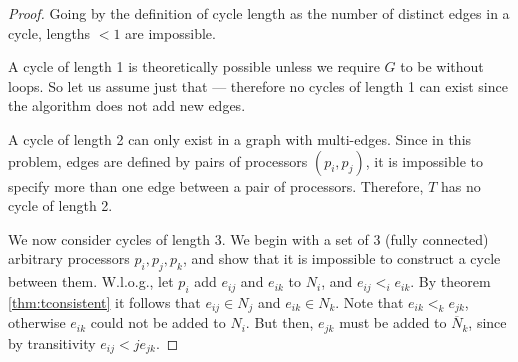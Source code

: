 \begin{proof}
Going by the definition of cycle length as the number of distinct edges in a
cycle, lengths $< 1$ are impossible.

A cycle of length 1 is theoretically possible unless we require $G$ to be
without loops. So let us assume just that --- therefore no cycles of length
1 can exist since the algorithm does not add new edges.

A cycle of length 2 can only exist in a graph with multi-edges. 
Since in this problem, edges are defined by pairs of processors $(p_i, p_j)$,
it is impossible to specify more than one edge between a pair of processors.
Therefore, $T$ has no cycle of length 2.

We now consider cycles of length 3. We begin with a set of 3 (fully connected)
arbitrary processors
$p_i, p_j, p_k$, and show that it is impossible to construct a cycle between them.
W.l.o.g., let $p_i$ add $e_{ij}$ and $e_{ik}$ to $N_i$, and $e_{ij} <_i e_{ik}$.
By theorem \ref{thm:tconsistent} it follows that $e_{ij} \in N_j$ and $e_{ik}
\in N_k$. Note that $e_{ik} <_k e_{jk}$, otherwise $e_{ik}$ could not be added
to $N_i$. But then, $e_{jk}$ must be added to $\overline{N}_k$, since
by transitivity $e_{ij} <j e_{jk}$.
\end{proof}
